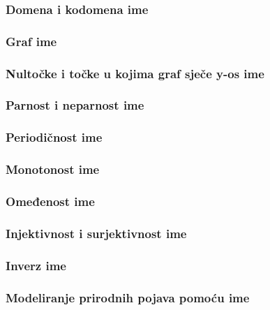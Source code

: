 \newcommand{\ime}{ime}

\subsubsection{Domena i kodomena \ime}
\subsubsection{Graf \ime}
\subsubsection{Nultočke i točke u kojima graf sječe y-os \ime}
\subsubsection{Parnost i neparnost \ime}
\subsubsection{Periodičnost \ime}
\subsubsection{Monotonost \ime}
\subsubsection{Omeđenost \ime}
\subsubsection{Injektivnost i surjektivnost \ime}
\subsubsection{Inverz \ime}
\subsubsection{Modeliranje prirodnih pojava pomoću \ime}